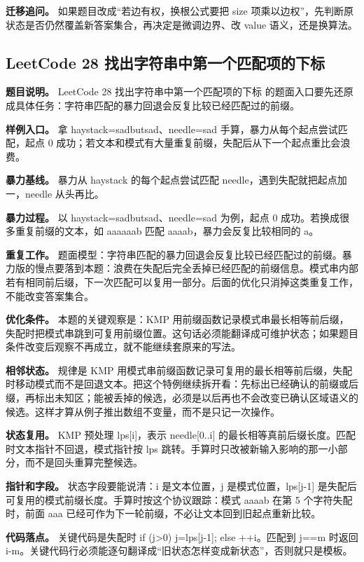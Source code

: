\textbf{迁移追问。} 如果题目改成“若边有权，换根公式要把 size 项乘以边权”，先判断原状态是否仍然覆盖新答案集合，再决定是微调边界、改 value 语义，还是换算法。

\subsection{LeetCode 28 找出字符串中第一个匹配项的下标}

\textbf{题目说明。} LeetCode 28 找出字符串中第一个匹配项的下标 的题面入口要先还原成具体任务：字符串匹配的暴力回退会反复比较已经匹配过的前缀。

\textbf{样例入口。} 拿 haystack=sadbutsad、needle=sad 手算，暴力从每个起点尝试匹配，起点 0 成功；若文本和模式有大量重复前缀，失配后从下一个起点重比会浪费。

\textbf{暴力基线。} 暴力从 haystack 的每个起点尝试匹配 needle，遇到失配就把起点加一，needle 从头再比。

\textbf{暴力过程。} 以 haystack=sadbutsad、needle=sad 为例，起点 0 成功。若换成很多重复前缀的文本，如 aaaaaab 匹配 aaaab，暴力会反复比较相同的 a。

\textbf{重复工作。} 题面模型：字符串匹配的暴力回退会反复比较已经匹配过的前缀。暴力版的慢点要落到本题：浪费在失配后完全丢掉已经匹配的前缀信息。模式串内部若有相同前后缀，下一次匹配可以复用一部分。后面的优化只消掉这类重复工作，不能改变答案集合。

\textbf{优化条件。} 本题的关键观察是：KMP 用前缀函数记录模式串最长相等前后缀，失配时把模式串跳到可复用前缀位置。这句话必须能翻译成可维护状态；如果题目条件改变后观察不再成立，就不能继续套原来的写法。

\textbf{相邻状态。} 规律是 KMP 用模式串前缀函数记录可复用的最长相等前后缀，失配时移动模式而不是回退文本。把这个特例继续拆开看：先标出已经确认的前缀或后缀，再标出未知区；能被丢掉的候选，必须是以后再也不会改变已确认区域语义的候选。这样才算从例子推出数组不变量，而不是只记一次操作。

\textbf{状态复用。} KMP 预处理 lps[i]，表示 needle[0..i] 的最长相等真前后缀长度。匹配时文本指针不回退，模式指针按 lps 跳转。手算时只改被新输入影响的那一小部分，而不是回头重算完整候选。

\textbf{指针和字段。} 状态字段要能说清：i 是文本位置，j 是模式位置，lps[j-1] 是失配后可复用的模式前缀长度。手算时按这个协议跟踪：模式 aaaab 在第 5 个字符失配时，前面 aaa 已经可作为下一轮前缀，不必让文本回到旧起点重新比较。

\textbf{代码落点。} 关键代码是失配时 if (j>0) j=lps[j-1]; else ++i。匹配到 j==m 时返回 i-m。关键代码行必须能逐句翻译成“旧状态怎样变成新状态”，否则就只是模板。

